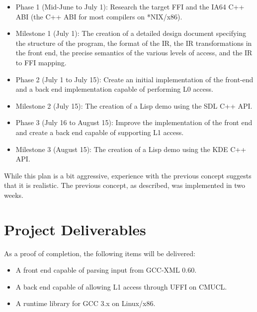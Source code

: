\documentclass[12pt]{article}
\begin{document}
\begin{itemize}
\item Phase 1 (Mid-June to July 1): Research the target FFI and the IA64 C++
ABI (the C++ ABI for most compilers on *NIX/x86).

\item Milestone 1 (July 1): The creation of a detailed design document
specifying the structure of the program, the format of the IR, the IR
transformations in the front end, the precise semantics of the various
levels of access, and the IR to FFI mapping.

\item Phase 2 (July 1 to July 15): Create an initial implementation of the
front-end and a back end implementation capable of performing L0
access.

\item Milestone 2 (July 15): The creation of a Lisp demo using the SDL C++ API.

\item Phase 3 (July 16 to August 15): Improve the implementation of the
front end and create a back end capable of supporting L1 access.

\item Milestone 3 (August 15): The creation of a Lisp demo using the KDE C++ API.
\end{itemize}

While this plan is a bit aggressive, experience with the previous
concept suggests that it is realistic. The previous concept, as
described, was implemented in two weeks.

\section{Project Deliverables}

As a proof of completion, the following items will be delivered:

\begin{itemize}
\item A front end capable of parsing input from GCC-XML 0.60.
\item A back end capable of allowing L1 access through UFFI on CMUCL.
\item A runtime library for GCC 3.x on Linux/x86.
\end{itemize}
\end{document}
